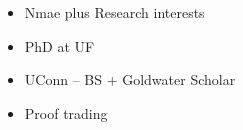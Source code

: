 

\begin{itemize}
    \item Nmae plus Research interests
    \item PhD at UF
    \item UConn -- BS + Goldwater Scholar
    \item Proof trading
\end{itemize}